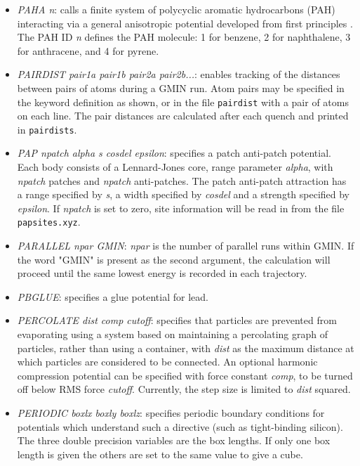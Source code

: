 \documentclass[12pt,a4paper,dvips]{article}
\begin{document}
\begin{itemize}
\item {\it PAHA n\/}: calls a finite system of polycyclic aromatic hydrocarbons (PAH) interacting 
via a general anisotropic potential developed from first principles \cite{TottonMK10}. The PAH ID  
{\it n} defines the PAH molecule: 1 for benzene, 2 for naphthalene, 3 for anthracene, and 4 for
pyrene.

\item{\it PAIRDIST pair1a pair1b pair2a pair2b...}: enables tracking of the distances between pairs of atoms during a GMIN run. Atom pairs may
be specified in the keyword definition as shown, or in the file {\tt pairdist} with a pair of atoms on each line. The pair distances are
calculated after each quench and printed in {\tt pairdists}.

\item {\it PAP npatch alpha s cosdel epsilon\/}: specifies a patch anti-patch potential. Each body consists of a Lennard-Jones core, range parameter {\it alpha\/}, with {\it npatch\/} patches and {\it npatch\/} anti-patches. The patch anti-patch attraction has a range specified by {\it s\/}, a width specified by {\it cosdel\/} and a strength specified by {\it epsilon\/}. If {\it npatch\/} is set to zero, site information will be read in from the file {\tt papsites.xyz\/}.

\item {\it PARALLEL npar GMIN\/}: {\it npar\/} is the number of parallel runs within GMIN.
If the word "GMIN" is present as the second argument, the calculation will proceed until the
same lowest energy is recorded in each trajectory.

\item {\it PBGLUE\/}: specifies a glue potential for lead.

\item {\it PERCOLATE dist comp cutoff\/}: specifies that particles are prevented from evaporating using a system based on maintaining a percolating graph of particles, rather than using a container, with {\it dist\/} as the maximum distance at which particles are considered to be connected. An optional harmonic compression potential can be specified with force constant {\it comp\/}, to be turned off below RMS force {\it cutoff\/}. Currently, the step size is limited to {\it dist\/} squared.

\item {\it PERIODIC boxlx boxly boxlz\/}: specifies periodic boundary conditions for
potentials which understand such a directive (such as tight-binding silicon). The three
double precision variables are the box lengths. If only one box length is given the
others are set to the same value to give a cube.


\end{itemize}
\end{document}
